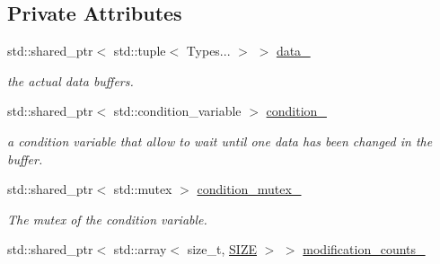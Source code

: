 \subsection*{Private Attributes}
\begin{DoxyCompactItemize}
\item 
std\+::shared\+\_\+ptr$<$ std\+::tuple$<$ Types... $>$ $>$ \hyperlink{classreal__time__tools_1_1ThreadsafeObject_a2e73d9d8db2fd54768adfd2f67df68fb}{data\+\_\+}\hypertarget{classreal__time__tools_1_1ThreadsafeObject_a2e73d9d8db2fd54768adfd2f67df68fb}{}\label{classreal__time__tools_1_1ThreadsafeObject_a2e73d9d8db2fd54768adfd2f67df68fb}

\begin{DoxyCompactList}\small\item\em the actual data buffers. \end{DoxyCompactList}\item 
std\+::shared\+\_\+ptr$<$ std\+::condition\+\_\+variable $>$ \hyperlink{classreal__time__tools_1_1ThreadsafeObject_a0f39feab7508852adab81ad4318f47e6}{condition\+\_\+}\hypertarget{classreal__time__tools_1_1ThreadsafeObject_a0f39feab7508852adab81ad4318f47e6}{}\label{classreal__time__tools_1_1ThreadsafeObject_a0f39feab7508852adab81ad4318f47e6}

\begin{DoxyCompactList}\small\item\em a condition variable that allow to wait until one data has been changed in the buffer. \end{DoxyCompactList}\item 
std\+::shared\+\_\+ptr$<$ std\+::mutex $>$ \hyperlink{classreal__time__tools_1_1ThreadsafeObject_a202a8fd66fe64138bc0cfa35a8dd745e}{condition\+\_\+mutex\+\_\+}\hypertarget{classreal__time__tools_1_1ThreadsafeObject_a202a8fd66fe64138bc0cfa35a8dd745e}{}\label{classreal__time__tools_1_1ThreadsafeObject_a202a8fd66fe64138bc0cfa35a8dd745e}

\begin{DoxyCompactList}\small\item\em The mutex of the condition variable. \end{DoxyCompactList}\item 
std\+::shared\+\_\+ptr$<$ std\+::array$<$ size\+\_\+t, \hyperlink{classreal__time__tools_1_1ThreadsafeObject_af05c02b66f0b75ea12cde9274bc2a97d}{S\+I\+ZE} $>$ $>$ \hyperlink{classreal__time__tools_1_1ThreadsafeObject_a20e108057d1da31ebc416d5b3577ac21}{modification\+\_\+counts\+\_\+}\hypertarget{classreal__time__tools_1_1ThreadsafeObject_a20e108057d1da31ebc416d5b3577ac21}{}\label{classreal__time__tools_1_1ThreadsafeObject_a20e108057d1da31ebc416d5b3577ac21}


\end{DoxyCompactItemize}
